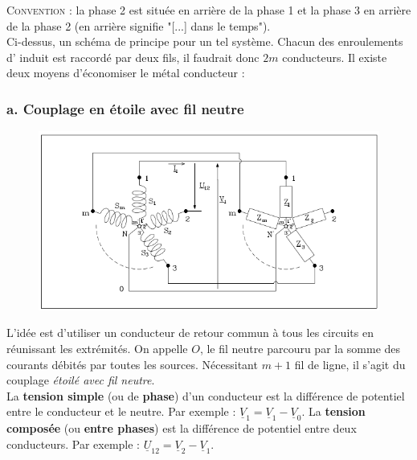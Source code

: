 \textsc{Convention :} la phase 2 est située en arrière de la phase 1 et la 
phase 3 en arrière de la phase 2 (en arrière signifie "[...] dans le temps").\\
	
Ci-dessus, un schéma de principe pour un tel système. Chacun des enroulements d'
induit est raccordé par deux fils, il faudrait donc $2m$ conducteurs. Il existe 
deux moyens d'économiser le métal conducteur :
	
\subsubsection{a. Couplage en étoile avec fil neutre}
\begin{figure}
	\vspace{-5mm}
	\includegraphics[scale=0.4]{ch1/image6.png}
\end{figure}
L'idée est d'utiliser un conducteur de retour commun à tous les circuits 
en réunissant les extrémités. On appelle $O$, le fil neutre parcouru par 
la somme des courants débités par toutes les sources. Nécessitant $m+1$ 
fil de ligne, il s'agit du couplage \textit{étoilé avec fil neutre}.\\
		
La \textbf{tension simple} (ou de \textbf{phase}) d'un conducteur est 
la différence de potentiel entre le conducteur et le neutre. Par 
exemple : $\underline{V}_1 = \underline{V}_1-\underline{V}_0$. La 
\textbf{tension composée} (ou \textbf{entre phases}) est la différence 
de potentiel entre deux conducteurs. Par exemple : $\underline{U}_{12} = 
\underline{V}_2-\underline{V}_1$.
		
		
